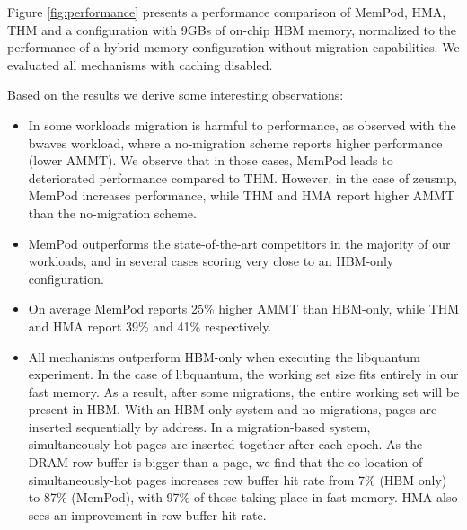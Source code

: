 Figure \ref{fig:performance} presents a performance comparison of MemPod, HMA, THM and a configuration with 9GBs of on-chip HBM memory, normalized to the performance of a hybrid memory configuration without migration capabilities. We evaluated all mechanisms with caching disabled. 

Based on the results we derive some interesting observations:
\begin{itemize}[leftmargin=0.4cm]
\setlength\itemsep{0em}
	\item {} In some workloads migration is harmful to performance, as observed with the bwaves workload, where a no-migration scheme reports higher performance (lower AMMT). We observe that in those cases, MemPod leads to deteriorated performance compared to THM. However, in the case of zeusmp, MemPod increases performance, while THM and HMA report higher AMMT than the no-migration scheme.
	\item MemPod outperforms the state-of-the-art competitors in the majority of our workloads, and in several cases scoring very close to an HBM-only configuration. 
	\item On average MemPod reports 25\% higher AMMT than HBM-only, while THM and HMA report 39\% and 41\% respectively.
	\item All mechanisms outperform HBM-only when executing the libquantum experiment. In the case of libquantum, the working set size fits entirely in our fast memory. As a result, after some migrations, the entire working set will be present in HBM.  With an HBM-only system and no migrations, pages
are inserted sequentially by address.  In a migration-based system, 
simultaneously-hot pages are inserted together after each epoch.  As the
DRAM row buffer is bigger than a page, we find that the co-location of
simultaneously-hot pages increases row buffer hit rate from 7\% (HBM only)
to 87\% (MemPod), with 97\% of those taking place in fast memory.  HMA also sees an improvement in row buffer hit rate.
\end{itemize}

